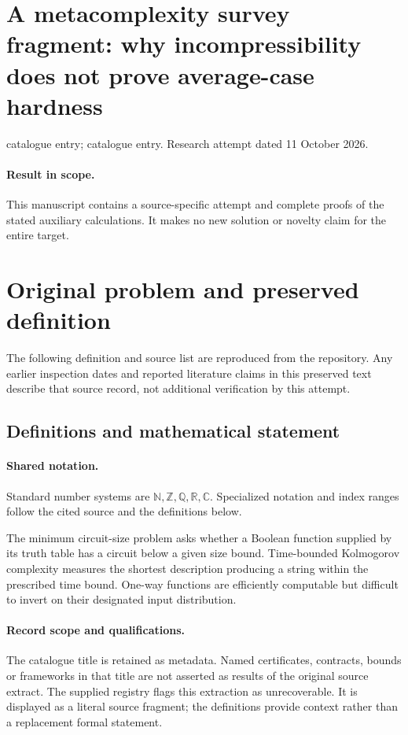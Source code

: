 \documentclass[11pt]{article}
\begin{document}
\section*{A metacomplexity survey fragment: why incompressibility does not prove average-case hardness}
\noindent catalogue entry; catalogue entry. Research attempt dated 11 October 2026.
\paragraph{Result in scope.}This manuscript contains a source-specific attempt and complete proofs of the stated auxiliary calculations. It makes no new solution or novelty claim for the entire target.
\section{Original problem and preserved definition}
The following definition and source list are reproduced from the repository. Any earlier inspection dates and reported literature claims in this preserved text describe that source record, not additional verification by this attempt.
\subsection{Definitions and mathematical statement}

\paragraph{Shared notation.}Standard number systems are $\mathbb N,\mathbb Z,\mathbb Q,\mathbb R,\mathbb C$. Specialized notation and index ranges follow the cited source and the definitions below.


The minimum circuit-size problem asks whether a Boolean function supplied by its truth table has a circuit below a given size bound. Time-bounded Kolmogorov complexity measures the shortest description producing a string within the prescribed time bound. One-way functions are efficiently computable but difficult to invert on their designated input distribution.
\paragraph{Record scope and qualifications.}
The catalogue title is retained as metadata. Named certificates, contracts, bounds or frameworks in that title are not asserted as results of the original source extract.
The supplied registry flags this extraction as unrecoverable. It is displayed as a literal source fragment; the definitions provide context rather than a replacement formal statement.
\end{document}
